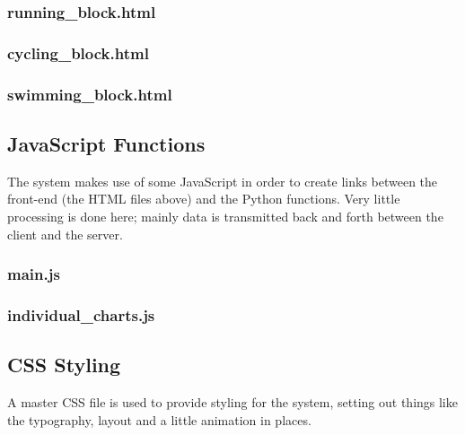 \documentclass{article}[12pt,a4paper]
\begin{document}
\subsubsection{running\_block.html}


\subsubsection{cycling\_block.html}


\subsubsection{swimming\_block.html}



\subsection{JavaScript Functions}
The system makes use of some JavaScript in order to create links between the front-end (the HTML files above) and the Python functions. Very little processing is done here; mainly data is transmitted back and forth between the client and the server.

\subsubsection{main.js}


\subsubsection{individual\_charts.js}



\subsection{CSS Styling}
A master CSS file is used to provide styling for the system, setting out things like the typography, layout and a little animation in places.


\end{document}
